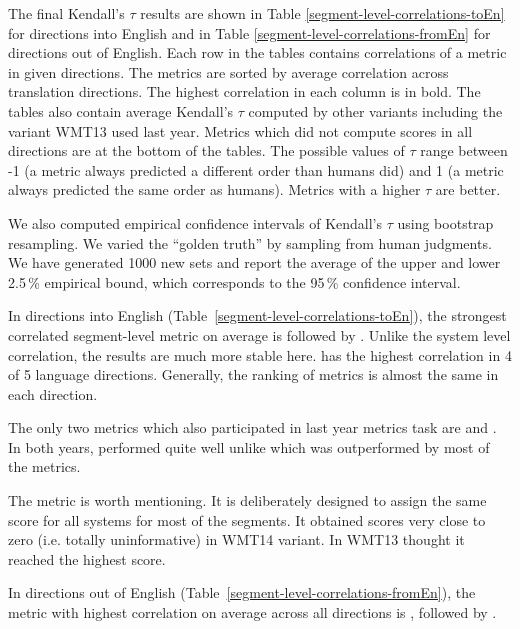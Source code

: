 \afterpage{\clearpage}




The final Kendall's $\tau$ results are shown in Table
\ref{segment-level-correlations-toEn} for directions into English and in Table
\ref{segment-level-correlations-fromEn} for directions out of English.  Each
row in the tables contains correlations of a metric in given directions. The
metrics are sorted by average correlation across translation directions.  The
highest correlation in each column is in bold.  The tables also contain average
Kendall's $\tau$ computed by other variants including the variant WMT13 used
last year.  Metrics which did not compute scores in all directions
are at the bottom of the tables. The possible values of $\tau$ range between -1
(a metric always predicted a different order than humans did) and 1 (a metric
always predicted the same order as humans). Metrics with a higher $\tau$ are
better.

We also computed empirical confidence intervals of Kendall's $\tau$ using bootstrap
resampling. We varied the ``golden truth'' by sampling from human judgments. We
have generated 1000 new sets and report the average of the upper and lower
2.5\,\% empirical bound, which corresponds to the 95\,\% confidence interval.




In directions into English (Table~\ref{segment-level-correlations-toEn}), the
strongest correlated segment-level metric on average is
 followed by . Unlike the system level
correlation, the results are much more stable here.
 has the highest correlation in 4 of 5 language
directions. Generally, the ranking of metrics is almost the same in each
direction. 

The only two metrics which also participated in last year metrics task are
 and . In both years,  performed
quite well unlike  which was outperformed by most of the
metrics. 

The metric  is worth mentioning.  It is deliberately
designed to assign the same score for all systems for most of the segments.  It
obtained scores very close to zero (i.e. totally uninformative) in WMT14
variant.  In WMT13 thought it reached the highest score.

In directions out of English (Table~\ref{segment-level-correlations-fromEn}),
the metric with highest correlation on average across all directions is
, followed by .

